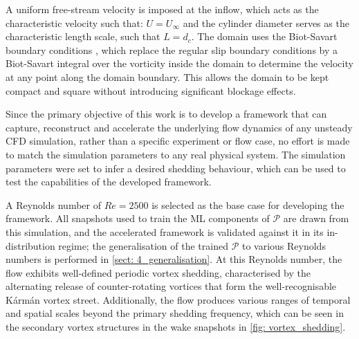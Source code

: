 A uniform free-stream velocity is imposed at the inflow, which acts as the characteristic velocity such that: $U = U_\infty$ and the cylinder diameter serves as the characteristic length scale, such that $L=d_c$. The domain uses the Biot-Savart boundary conditions \cite{BiotWeymouth2025}, which replace the regular slip boundary conditions by a Biot-Savart integral over the vorticity inside the domain to determine the velocity at any point along the domain boundary. This allows the domain to be kept compact and square without introducing significant blockage effects. 

Since the primary objective of this work is to develop a framework that can capture, reconstruct and accelerate the underlying flow dynamics of any unsteady CFD simulation, rather than a specific experiment or flow case, no effort is made to match the simulation parameters to any real physical system. The simulation parameters were set to infer a desired shedding behaviour, which can be used to test the capabilities of the developed framework.

A Reynolds number of $Re=2500$ is selected as the base case for developing the framework. All snapshots used to train the ML components of $\mathcal{P}$ are drawn from this simulation, and the accelerated framework is validated against it in its in-distribution regime; the generalisation of the trained $\mathcal{P}$ to various Reynolds numbers is performed in \autoref{sect: 4_generalisation}. At this Reynolds number, the flow exhibits well-defined periodic vortex shedding, characterised by the alternating release of counter-rotating vortices that form the well-recognisable Kármán vortex street. Additionally, the flow produces various ranges of temporal and spatial scales beyond the primary shedding frequency, which can be seen in the secondary vortex structures in the wake snapshots in \autoref{fig: vortex_shedding}.

